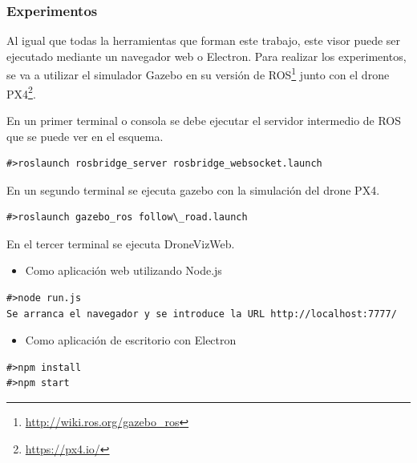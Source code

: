 \subsubsection{Experimentos}
Al igual que todas la herramientas que forman este trabajo, este visor puede ser ejecutado mediante un navegador web o Electron. Para realizar los experimentos, se va a utilizar el simulador Gazebo en su versión de ROS\footnote{\url{http://wiki.ros.org/gazebo_ros}} junto con el drone PX4\footnote{\url{https://px4.io/}}.

En un primer terminal o consola se debe ejecutar el servidor intermedio de ROS que se puede ver en el esquema.
\begin{lstlisting}[caption= Ejecución del servidor intermedio, label=cod.servidorintermediodrone]
#>roslaunch rosbridge_server rosbridge_websocket.launch
\end{lstlisting}

En un segundo terminal se ejecuta gazebo con la simulación del drone PX4.

\begin{lstlisting}[caption= Ejecución de gazebo con el drone PX4 label=cod.gazebodrone]
#>roslaunch gazebo_ros follow\_road.launch
\end{lstlisting}

En el tercer terminal se ejecuta DroneVizWeb.

\begin{itemize}
\item Como aplicación web utilizando Node.js
\end{itemize}
\begin{lstlisting}[caption= Ejecución con Node.js, label=cod.dronenodejs]
#>node run.js
Se arranca el navegador y se introduce la URL http://localhost:7777/
\end{lstlisting}
\begin{itemize}
\item Como aplicación de escritorio con Electron
\end{itemize}
\begin{lstlisting}[caption= Ejecución con Electron, label=cod.droneelectron]
#>npm install
#>npm start
\end{lstlisting}

